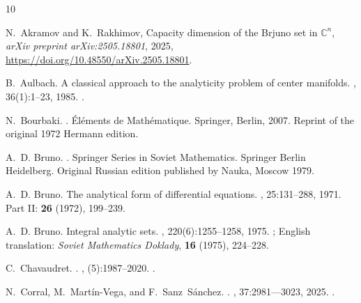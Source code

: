\documentclass[10pt,twoside,reqno]{amsart}
\theoremstyle{remark}
\theoremstyle{remark}
\begin{document}
\begin{thebibliography}{10}

	N.~Akramov and K.~Rakhimov,
	\newblock Capacity dimension of the Brjuno set in $\mathbb{C}^n$,
	\newblock \emph{arXiv preprint arXiv:2505.18801}, 2025,
	\newblock \url{https://doi.org/10.48550/arXiv.2505.18801}.
	
	B.~Aulbach.
	\newblock A classical approach to the analyticity problem of center manifolds.
	,
	36(1):1--23, 1985.
	\newblock \href {https://doi.org/10.1007/BF00949030}
	{}.
	
	N.~Bourbaki.
	.
	\newblock \'El\'ements de Math\'ematique.
	\newblock Springer, Berlin, 2007.
	\newblock Reprint of the original 1972 Hermann edition.
	
	A.~D. Bruno.
	.
	\newblock Springer Series in Soviet Mathematics. Springer Berlin Heidelberg.
	\newblock Original Russian edition published by Nauka, Moscow 1979.
	
	A.~D. Bruno.
	\newblock The analytical form of differential equations.
	, 25:131--288,
	1971.
	\newblock Part II: \textbf{26} (1972), 199--239.
	
	A.~D. Bruno.
	\newblock Integral analytic sets.
	, 220(6):1255--1258, 1975.
	\newblock [in Russian]; English translation: \emph{Soviet Mathematics Doklady},
	\textbf{16} (1975), 224--228.
	
	C.~Chavaudret.
	.
	, (5):1987--2020.
	\newblock \href {https://doi.org/10.5802/aif.3055}
	{}.
	
	N.~Corral, M.~Martín-Vega, and F.~Sanz~Sánchez.
	.
	,
	37:2981–--3023, 2025.
	\newblock \href {https://doi.org/10.1007/s10884-024-10377-4}
	{}.
	

\end{thebibliography}
\end{document}
